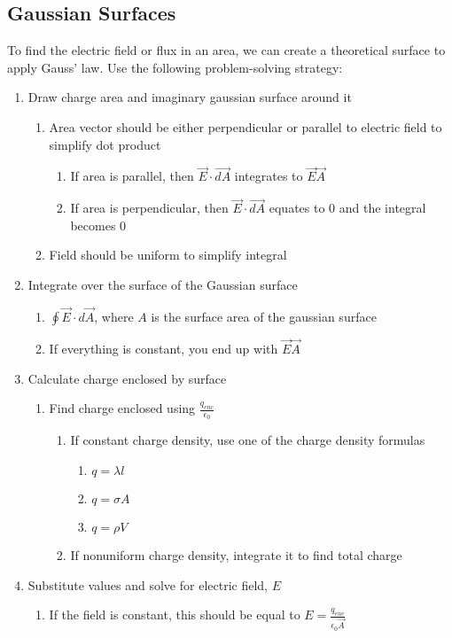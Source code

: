 \documentclass{article}
\begin{document}
\subsection{Gaussian Surfaces}
To find the electric field or flux in an area, we can create a theoretical surface to apply Gauss' law.  Use the following problem-solving strategy:
\begin{enumerate}
\item Draw charge area and imaginary gaussian surface around it
  \begin{enumerate}
  \item Area vector should be either perpendicular or parallel to electric field to simplify dot product
    \begin{enumerate}
    \item If area is parallel, then $\vec{E} \cdot \vec{dA}$ integrates to $\vec{E}\vec{A}$
    \item If area is perpendicular, then $\vec{E} \cdot \vec{dA}$ equates to $0$ and the integral becomes $0$
    \end{enumerate}
  \item Field should be uniform to simplify integral
  \end{enumerate}
\item Integrate over the surface of the Gaussian surface
  \begin{enumerate}
  \item $\oint \vec{E} \cdot d\vec{A}$, where $A$ is the surface area of the gaussian surface
    \item If everything is constant, you end up with $\vec{E}\vec{A}$
  \end{enumerate}
\item Calculate charge enclosed by surface
  \begin{enumerate}
  \item Find charge enclosed using $\frac{q_{enc}}{\epsilon_0}$
    \begin{enumerate}
    \item If constant charge density, use one of the charge density formulas
      \begin{enumerate}
      \item $q = \lambda l$
      \item $q = \sigma A$
      \item $q = \rho V$
      \end{enumerate}
    \item If nonuniform charge density, integrate it to find total charge
    \end{enumerate}
  \end{enumerate}
\item Substitute values and solve for electric field, $E$
  \begin{enumerate}
    \item If the field is constant, this should be equal to $E = \frac{q_{enc}}{\epsilon_0\vec{A}}$
  \end{enumerate}
\end{enumerate}
\end{document}
